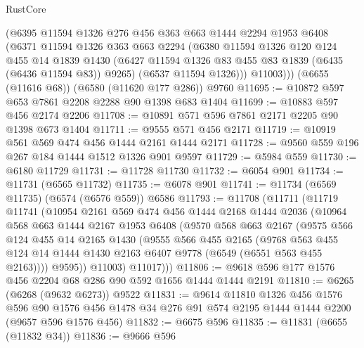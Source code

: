 \begin{lexlean}{RustCore}
\begin{coremodule}
        (@6395
          @11594
          @1326
          @276
          @456
          @363
          @663
          @1444
          @2294
          @1953
          @6408
          (@6371
            @11594
            @1326
            @363
            @663
            @2294
            (@6380
              @11594
              @1326
              @120
              @124
              @455
              @14
              @1839
              @1430
              (@6427 @11594 @1326 @83 @455 @83 @1839 (@6435 (@6436 @11594 @83)) @9265)
              (@6537 @11594 @1326)))
          @11003)))
    (@6655 (@11616 @68))
    (@6580 (@11620 @177 @286))
    @9760
@11695 := @10872 @597 @653 @7861 @2208 @2288 @90 @1398 @683 @1404
@11699 := @10883 @597 @456 @2174 @2206
@11708 := @10891 @571 @596 @7861 @2171 @2205 @90 @1398 @673 @1404
@11711 := @9555 @571 @456 @2171
@11719 := @10919 @561 @569 @474 @456 @1444 @2161 @1444 @2171
@11728 := @9560 @559 @196 @267 @184 @1444 @1512 @1326 @901 @9597
@11729 := @5984 @559
@11730 := @6180 @11729
@11731 := @11728 @11730
@11732 := @6054 @901
@11734 := @11731 (@6565 @11732)
@11735 := @6078 @901
@11741 := @11734 (@6569 @11735) (@6574 (@6576 @559)) @6586
@11793 := @11708
    (@11711
      (@11719
        @11741
        (@10954
          @2161
          @569
          @474
          @456
          @1444
          @2168
          @1444
          @2036
          (@10964
            @568
            @663
            @1444
            @2167
            @1953
            @6408
            (@9570
              @568
              @663
              @2167
              (@9575
                @566
                @124
                @455
                @14
                @2165
                @1430
                (@9555
                  @566
                  @455
                  @2165
                  (@9768
                    @563
                    @455
                    @124
                    @14
                    @1444
                    @1430
                    @2163
                    @6407
                    @9778
                    (@6549 (@6551 @563 @455 @2163))))
                @9595))
            @11003)
          @11017)))
@11806 := @9618 @596 @177 @1576 @456 @2204 @68 @286 @90 @592 @1656 @1444 @1444 @2191
@11810 := @6265 (@6268 (@9632 @6273)) @9522
@11831 := @9614
    @11810
    @1326
    @456
    @1576
    @596
    @90
    @1576
    @456
    @1478
    @34
    @276
    @91
    @574
    @2195
    @1444
    @1444
    @2200
    (@9657 @596 @1576 @456)
@11832 := @6675 @596
@11835 := @11831 (@6655 (@11832 @34))
@11836 := @9666 @596

\end{coremodule}
\end{lexlean}
